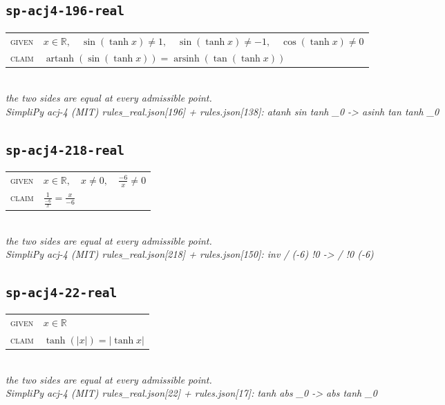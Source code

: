 \documentclass[11pt]{article}
\begin{document}
\subsection*{\texttt{sp-acj4-196-real}}
\begin{tabular}{@{}l@{\quad}l@{}}
\textsc{given} & $x \in \mathbb{R},\quad \sin\left(\tanh x\right) \neq 1,\quad \sin\left(\tanh x\right) \neq -1,\quad \cos\left(\tanh x\right) \neq 0$ \\[4pt]
\textsc{claim} & $\displaystyle \operatorname{artanh}\left(\sin\left(\tanh x\right)\right) = \operatorname{arsinh}\left(\tan\left(\tanh x\right)\right)$ \\
\end{tabular}\\[2pt]
{\small\emph{the two sides are equal at every admissible point.}}\\
\emph{SimpliPy acj-4 (MIT) rules\_real.json[196] + rules.json[138]: atanh sin tanh \_0  ->  asinh tan tanh \_0}\\

\subsection*{\texttt{sp-acj4-218-real}}
\begin{tabular}{@{}l@{\quad}l@{}}
\textsc{given} & $x \in \mathbb{R},\quad x \neq 0,\quad \frac{-6}{x} \neq 0$ \\[4pt]
\textsc{claim} & $\displaystyle \frac{1}{\frac{-6}{x}} = \frac{x}{-6}$ \\
\end{tabular}\\[2pt]
{\small\emph{the two sides are equal at every admissible point.}}\\
\emph{SimpliPy acj-4 (MIT) rules\_real.json[218] + rules.json[150]: inv / (-6) !0  ->  / !0 (-6)}\\

\subsection*{\texttt{sp-acj4-22-real}}
\begin{tabular}{@{}l@{\quad}l@{}}
\textsc{given} & $x \in \mathbb{R}$ \\[4pt]
\textsc{claim} & $\displaystyle \tanh\left(\left|x\right|\right) = \left|\tanh x\right|$ \\
\end{tabular}\\[2pt]
{\small\emph{the two sides are equal at every admissible point.}}\\
\emph{SimpliPy acj-4 (MIT) rules\_real.json[22] + rules.json[17]: tanh abs \_0  ->  abs tanh \_0}\\
\end{document}

